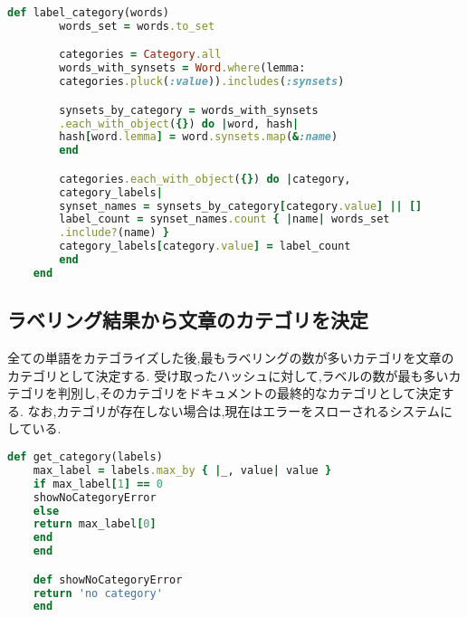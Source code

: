 \begin{lstlisting}[language=Ruby, caption=カテゴリのラベリングメソッド]
    def label_category(words)
        words_set = words.to_set

        categories = Category.all
        words_with_synsets = Word.where(lemma:
        categories.pluck(:value)).includes(:synsets)

        synsets_by_category = words_with_synsets
        .each_with_object({}) do |word, hash|
        hash[word.lemma] = word.synsets.map(&:name)
        end

        categories.each_with_object({}) do |category,
        category_labels|
        synset_names = synsets_by_category[category.value] || []
        label_count = synset_names.count { |name| words_set
        .include?(name) }
        category_labels[category.value] = label_count
        end
    end
\end{lstlisting}


\clearpage

\subsection{ラベリング結果から文章のカテゴリを決定}
\label{subsec:app_classify}

全ての単語をカテゴライズした後,最もラベリングの数が多いカテゴリを文章のカテゴリとして決定する.
受け取ったハッシュに対して,ラベルの数が最も多いカテゴリを判別し,そのカテゴリをドキュメントの最終的なカテゴリとして決定する.
なお,カテゴリが存在しない場合は,現在はエラーをスローされるシステムにしている.

\begin{lstlisting}[language=Ruby, caption=文書のカテゴリを決定するメソッド]
    def get_category(labels)
    max_label = labels.max_by { |_, value| value }
    if max_label[1] == 0
    showNoCategoryError
    else
    return max_label[0]
    end
    end

    def showNoCategoryError
    return 'no category'
    end
\end{lstlisting}


\clearpage


